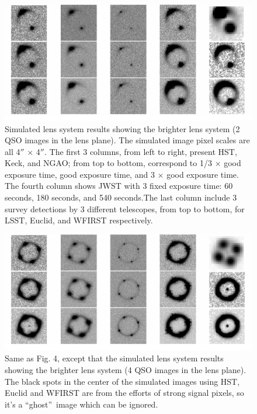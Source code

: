 \documentclass[a4paper,11pt]{article}
\begin{document}
\begin{figure}
\begin{center}
\includegraphics[width=1.0\textwidth]{figures/brighter_system_2QSOimages_all.png}
\end{center}
\caption{Simulated lens system results showing the brighter lens system (2 QSO images in the lens plane). The simulated image pixel scales are all 4$''$ $\times$ 4$''$. The first 3 columns, from left to right, present HST, Keck, and NGAO; from top to bottom, correspond to 1/3 $\times$ good exposure time, good exposure time, and 3 $\times$ good exposure time. The fourth column shows JWST with 3 fixed exposure time: 60 seconds, 180 seconds, and 540 seconds.The last column include 3 survey detections by 3 different telescopes, from top to bottom, for LSST, Euclid, and WFIRST respectively.}
\label{fig:brighter_2QSOimages_montage}
\end{figure}


\begin{figure}
\begin{center}
\includegraphics[width=1.0\textwidth]{figures/brighter_system_4QSOimages_all.png}
\end{center}
\caption{Same as Fig. 4, except that the simulated lens system results showing the brighter lens system (4 QSO images in the lens plane). The black spots in the center of the simulated images using HST, Euclid and WFIRST are from the efforts of strong signal pixels, so it's a \textquotedblleft ghost\textquotedblright\ image which can be ignored.}
\label{fig:brighter_4QSOimages_montage}
\end{figure}
\end{document}
